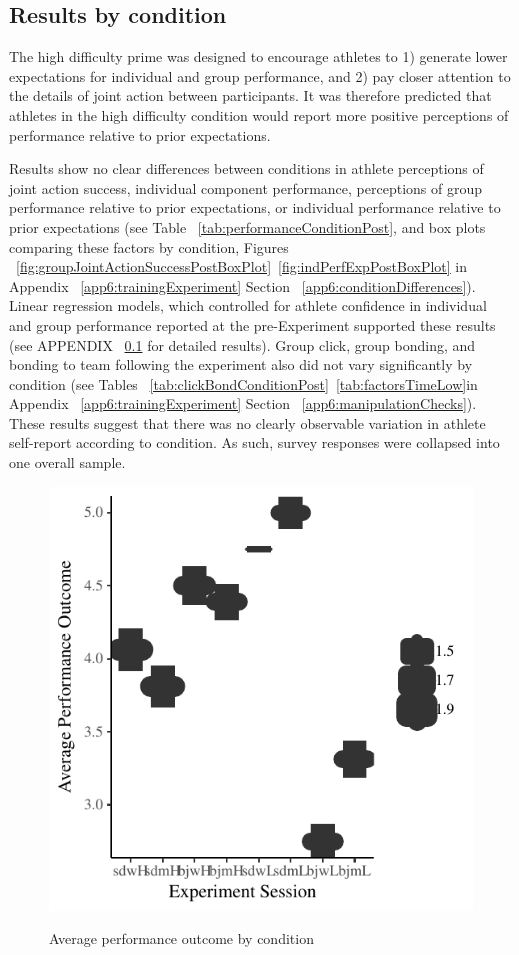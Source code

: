 \subsection{Results by condition}
The high difficulty prime was designed to encourage athletes to 1) generate lower expectations for individual and group performance, and 2) pay closer attention to the details of joint action between participants.  It was therefore predicted that athletes in the high difficulty condition would report more positive perceptions of performance relative to prior expectations.

  \begin{landscape}
    \centering
      
   \end{landscape}
\restoregeometry


 Results show no clear differences between conditions in athlete perceptions of joint action success, individual component performance, perceptions of group performance relative to prior expectations, or individual performance relative to prior expectations (see Table ~\ref{tab:performanceConditionPost}, and
 box plots comparing these factors by condition, Figures ~\ref{fig:groupJointActionSuccessPostBoxPlot}\nobreakdash~\ref{fig:indPerfExpPostBoxPlot} in Appendix ~\ref{app6:trainingExperiment} Section ~\ref{app6:conditionDifferences}).  Linear regression models, which controlled for athlete confidence in individual and group performance reported at the pre-Experiment supported these results (see APPENDIX ~\ref{} for detailed results). Group click, group bonding, and bonding to team following the experiment also did not vary significantly by condition (see Tables ~\ref{tab:clickBondConditionPost}\nobreakdash~\ref{tab:factorsTimeLow}in Appendix ~\ref{app6:trainingExperiment} Section ~\ref{app6:manipulationChecks}).  These results suggest that there was no clearly observable variation in athlete self-report according to condition.  As such, survey responses were collapsed into one overall sample.



\begin{figure}
  \centering
  \includegraphics[width=0.5\linewidth,keepaspectratio] {images/fullOutcomeAvgSessionBoxplot-1}
  \label{fig:fullOutcomeAvgSessionBoxplot}
  \caption{Average performance outcome by condition}
\end{figure}

